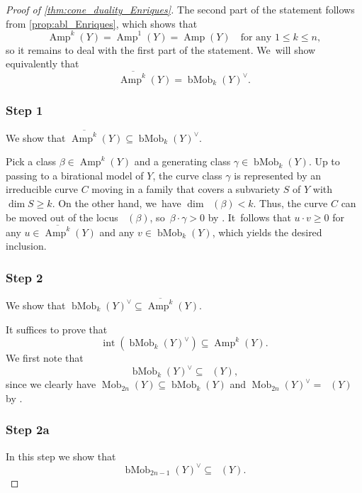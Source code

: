 \documentclass[JEP,XML,SOM,Unicode,published]{cedram}
\theoremstyle{plain}
\theoremstyle{definition}
\DeclareMathOperator{\Amp}{\mathrm{Amp}}
\DeclareMathOperator{\Pseff}{\overline{\mathrm{Eff}}}
\DeclareMathOperator{\Movb}{\overline{\mathrm{Mov}}}
\DeclareMathOperator{\Mob}{Mob}
\DeclareMathOperator{\bMob}{bMob}
\DeclareMathOperator{\abs}{\boldsymbol{B}_{+}}
\begin{document}
\begin{proof}[Proof of \autoref{thm:cone_duality_Enriques}]
The second part of the statement follows from \autoref{prop:abl_Enriques}, which shows that
\[
\Amp^k(Y) = \Amp^1(Y) = \Amp(Y) \quad \text{for any } 1 \leq k \leq n,
\]
so it remains to deal with the first part of the statement. We~will show equivalently that
\[
\overline{\Amp^k}(Y) = \bMob_k(Y)^\vee.
\]

\subsubsection*{Step 1}
We show that $ \overline{\Amp^k}(Y) \subseteq \bMob_k(Y)^\vee$.

Pick a class $\beta \in \Amp^k(Y)$ and a generating class $\gamma \in \bMob_k(Y)$. Up to passing to a birational model of $Y$, the curve class $\gamma$ is represented by an irreducible curve $C$ moving in a family that covers a subvariety $S$ of $Y$ with $\dim S \geq k$.
On the other hand, we~have $\dim \abs(\beta) < k$.
Thus, the curve $C$ can be moved out of the locus $\abs(\beta)$, so~$\beta \cdot \gamma > 0$ by \cite[Rem.\,2.8]{DRO25}. It~follows that $u \cdot v \geq 0$ for any $u \in \overline{\Amp^k}(Y)$ and any $v \in \bMob_k(Y)$, which yields the desired inclusion.

\subsubsection*{Step 2}
We show that $ \bMob_k(Y)^\vee \subseteq \overline{\Amp^k}(Y)$.

It suffices to prove that
\begin{equation}
\label{eq:interiors}
\operatorname{int} \left(\bMob_k(Y)^{\vee} \right) \subseteq \Amp^k(Y).
\end{equation}
We first note that
\begin{equation}
\label{eq:1_bMob_in_pseff}
\bMob_k(Y)^{\vee} \subseteq \Pseff(Y),
\end{equation}
since we clearly have $\Mob_{2n}(Y) \subseteq \bMob_k(Y)$ and $\Mob_{2n}(Y)^{\vee} = \Pseff(Y)$ by \cite[Th.\,2.2]{BDPP13}.

\subsubsection*{Step 2a}
In this step we show that
\begin{equation}
\label{eq:2_bMob_in_Movb}
\bMob_{2n-1}(Y)^{\vee} \subseteq \Movb(Y).
\end{equation}


\end{proof}
\end{document}
